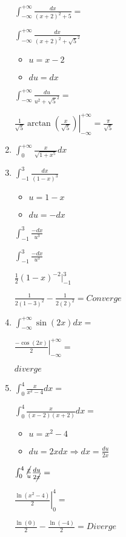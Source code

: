 \documentclass[../practica_08.tex]{subfiles}
\begin{document}
\begin{enumerate}
            $ \int_{-\infty}^{+\infty} \frac{dx}{(x+2)^2 + 5} = $

            $ \int_{-\infty}^{+\infty} \frac{dx}{(x+2)^2 + \sqrt{5}^2} $
            
            \begin{itemize}
                \item $u = x-2$
                \item $du = dx$
            \end{itemize}
            
            $ \int_{-\infty}^{+\infty} \frac{du}{u^2 + \sqrt{5}^2} =$

            $ \left. \frac{1}{\sqrt{5}} \arctan(\frac{x}{\sqrt{5}}) \right |_{-\infty}^{+\infty} = \frac{\pi}{\sqrt{5}} $

        \item $\int_{0}^{+\infty} \frac{x}{\sqrt{1+x^5}}dx$
        


        \item $\int_{-1}^{3} \frac{dx}{(1-x)^3}$
        
            \begin{itemize}
                \item $u = 1-x$
                \item $du = -dx$
            \end{itemize}

            $\int_{-1}^{3} \frac{-dx}{u^3}$

            $\int_{-1}^{3} \frac{-dx}{u^3}$

            $\left. \frac{1}{2}(1-x)^{-2} \right. |_{-1}^{3}$

            $ \frac{1}{2(1-3)^2} - \frac{1}{2(2)^2} = Converge$

        \item $\int_{-\infty}^{+\infty} \sin(2x)dx = $
        
            $\left. \frac{-\cos(2x)}{2} \right |_{-\infty}^{+\infty} = $

            $  diverge $

        \item $\int_{0}^{4} \frac{x}{x^2-4}dx = $
        
            $\int_{0}^{4} \frac{x}{(x-2)(x+2)}dx = $
        
        \begin{itemize}
            \item $u = x^2-4$
            \item $du = 2xdx \Rightarrow dx = \frac{du}{2x}$
        \end{itemize}

            $\int_{0}^{4} \frac{\cancel{x}}{u}\frac{du}{2\cancel{x}} = $
            
            $ \left. \frac{\ln(x^2-4)}{2} \right |_{0}^{4} =  $

            $ \frac{\ln(0)}{2} - \frac{\ln(-4)}{2} = Diverge $

    \end{enumerate}
\end{document}
